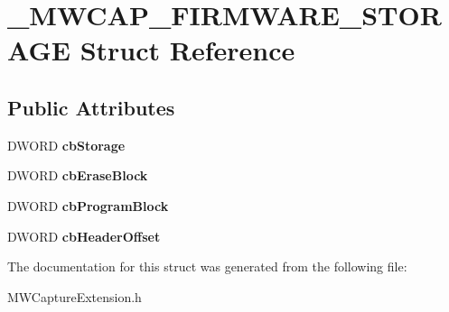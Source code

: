 \hypertarget{struct__MWCAP__FIRMWARE__STORAGE}{\section{\-\_\-\-M\-W\-C\-A\-P\-\_\-\-F\-I\-R\-M\-W\-A\-R\-E\-\_\-\-S\-T\-O\-R\-A\-G\-E Struct Reference}
\label{struct__MWCAP__FIRMWARE__STORAGE}
}
\subsection*{Public Attributes}
\begin{DoxyCompactItemize}
\item 
\hypertarget{struct__MWCAP__FIRMWARE__STORAGE_ac4834ee27c4463bc299a110b8a8a6c17}{D\-W\-O\-R\-D {\bfseries cb\-Storage}}\label{struct__MWCAP__FIRMWARE__STORAGE_ac4834ee27c4463bc299a110b8a8a6c17}

\item 
\hypertarget{struct__MWCAP__FIRMWARE__STORAGE_add2fd868d2e5efd0c41738a2c4a5d273}{D\-W\-O\-R\-D {\bfseries cb\-Erase\-Block}}\label{struct__MWCAP__FIRMWARE__STORAGE_add2fd868d2e5efd0c41738a2c4a5d273}

\item 
\hypertarget{struct__MWCAP__FIRMWARE__STORAGE_ae9c69a24a07bae6b74aede239e02fa34}{D\-W\-O\-R\-D {\bfseries cb\-Program\-Block}}\label{struct__MWCAP__FIRMWARE__STORAGE_ae9c69a24a07bae6b74aede239e02fa34}

\item 
\hypertarget{struct__MWCAP__FIRMWARE__STORAGE_a5e782b84887f88e52dedcbcb3f393549}{D\-W\-O\-R\-D {\bfseries cb\-Header\-Offset}}\label{struct__MWCAP__FIRMWARE__STORAGE_a5e782b84887f88e52dedcbcb3f393549}

\end{DoxyCompactItemize}


The documentation for this struct was generated from the following file\-:\begin{DoxyCompactItemize}
\item 
M\-W\-Capture\-Extension.\-h\end{DoxyCompactItemize}
